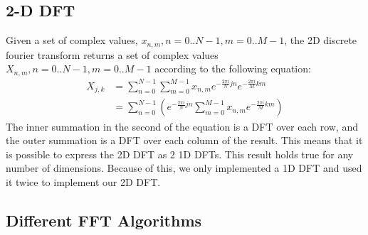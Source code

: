 \subsection{2-D DFT}
Given a set of complex values, $x_{n,m}, n=0..N-1, m=0..M-1$, the 2D discrete fourier transform returns a set of complex values $X_{n,m}, n=0..N-1, m=0..M-1$ according to the following equation:
\begin{align*}
	X_{j,k}&=\sum_{n=0}^{N-1}\sum_{m=0}^{M-1}x_{n,m} e^{-\frac{2\pi i}{N}jn}e^{-\frac{2\pi i}{M}km} \\
	&= \sum_{n=0}^{N-1} \left(e^{-\frac{2\pi i}{N}jn}\sum_{m=0}^{M-1}x_{n,m}e^{-\frac{2\pi i}{M}km}\right)
\end{align*}
The inner summation in the second of the equation is a DFT over each row, and the outer summation is a DFT over each column of the result. This means that it is possible to express the 2D DFT as 2 1D DFTs. This result holds true for any number of dimensions. Because of this, we only implemented a 1D DFT and used it twice to implement our 2D DFT.
\subsection{Different FFT Algorithms}
